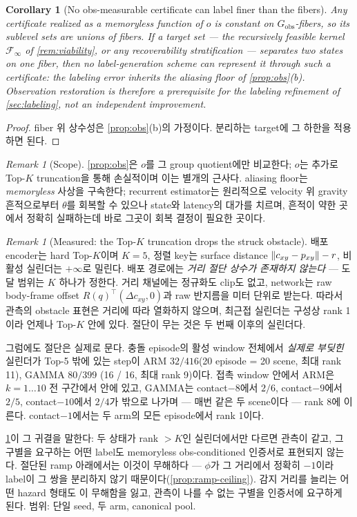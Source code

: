 \documentclass[11pt]{article}
\theoremstyle{plain}
\newtheorem{corollary}[theorem]{Corollary}
\theoremstyle{definition}
\theoremstyle{remark}
\newtheorem{remark}[theorem]{Remark}
\DeclarePairedDelimiter{\norm}{\lVert}{\rVert}
\begin{document}
\begin{corollary}[No obs-measurable certificate can label finer than the fibers]\label{cor:obs-label}
Any certificate realized as a memoryless function of $o$ is constant on
$G_{\mathrm{obs}}$-fibers, so its sublevel sets are unions of fibers. If a target set --- the
recursively feasible kernel $\mathcal F_\infty$ of \cref{rem:viability}, or any recoverability
stratification --- separates two states on one fiber, then no label-generation scheme can
represent it through such a certificate: the labeling error inherits the aliasing floor of
\cref{prop:obs}(b). Observation restoration is therefore a \emph{prerequisite} for the labeling
refinement of \cref{sec:labeling}, not an independent improvement.
\end{corollary}
\begin{proof}
fiber 위 상수성은 \cref{prop:obs}(b)의 가정이다. 분리하는 target에 그 하한을 적용하면 된다.
\end{proof}

\begin{remark}[Scope]\label{rem:obs-scope}
\cref{prop:obs}은 $o$를 그 group quotient에만 비교한다; $o$는 추가로 Top-$K$ truncation을 통해
손실적이며 이는 별개의 근사다. aliasing floor는 \emph{memoryless} 사상을 구속한다; recurrent
estimator는 원리적으로 velocity 위 gravity 흔적으로부터 $\theta$를 회복할 수 있으나 state와
latency의 대가를 치르며, 흔적이 약한 곳에서 정확히 실패하는데 바로 그곳이 회복 결정이 필요한
곳이다.
\end{remark}

\begin{remark}[Measured: the Top-$K$ truncation drops the struck obstacle]\label{rem:topk-measured}
배포 encoder는 hard Top-$K$이며 $K=5$, 정렬 key는 surface distance
$\norm{c_{xy}-p_{xy}}-r$, 비활성 실린더는 $+\infty$로 밀린다. 배포 경로에는 \emph{거리 절단
상수가 존재하지 않는다} --- 도달 범위는 $K$ 하나가 정한다. 거리 채널에는 정규화도 clip도 없고,
network는 raw body-frame offset $R(q)^\top(\Delta c_{xy},0)$과 raw 반지름을 미터 단위로 받는다.
따라서 관측의 obstacle 표현은 거리에 따라 열화하지 않으며, 최근접 실린더는 구성상 rank 1이라
언제나 Top-$K$ 안에 있다. 절단이 무는 것은 두 번째 이후의 실린더다.

그럼에도 절단은 실제로 문다. 충돌 episode의 활성 window 전체에서 \emph{실제로 부딪힌} 실린더가
Top-5 밖에 있는 step이 ARM $32/416$(20 episode = 20 scene, 최대 rank 11), GAMMA $80/399$
(16 / 16, 최대 rank 9)이다. 접촉 window 안에서 ARM은 $k=1\ldots10$ 전 구간에서 안에 있고,
GAMMA는 contact$-8$에서 $2/6$, contact$-9$에서 $2/5$, contact$-10$에서 $2/4$가 밖으로 나가며 ---
매번 같은 두 scene이다 --- rank 8에 이른다. contact$-1$에서는 두 arm의 모든 episode에서 rank 1이다.

\cref{cor:obs-label}이 그 귀결을 말한다: 두 상태가 rank $>K$인 실린더에서만 다르면 관측이 같고,
그 구별을 요구하는 어떤 label도 memoryless obs-conditioned 인증서로 표현되지 않는다. 절단된
ramp 아래에서는 이것이 무해하다 --- $\phi$가 그 거리에서 정확히 $-1$이라 label이 그 쌍을 분리하지
않기 때문이다(\cref{prop:ramp-ceiling}). 감지 거리를 늘리는 어떤 hazard 형태도 이 무해함을 잃고,
관측이 나를 수 없는 구별을 인증서에 요구하게 된다. 범위: 단일 seed, 두 arm, canonical pool.
\end{remark}
\end{document}
